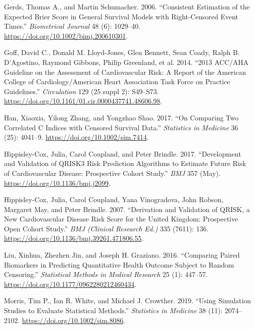 \documentclass[
]{article}
\newlength{\cslhangindent}
\newenvironment{cslreferences}%
  {\setlength{\parindent}{0pt}%
  \everypar{\setlength{\hangindent}{\cslhangindent}}\ignorespaces}%
  {\par}
\begin{document}
\begin{cslreferences}
\leavevmode\hypertarget{ref-gerds_consistent_2006}{}%
Gerds, Thomas A., and Martin Schumacher. 2006. ``Consistent Estimation of the Expected Brier Score in General Survival Models with Right-Censored Event Times.'' \emph{Biometrical Journal} 48 (6): 1029--40. \url{https://doi.org/10.1002/bimj.200610301}.

\leavevmode\hypertarget{ref-goff_2013_2014}{}%
Goff, David C., Donald M. Lloyd-Jones, Glen Bennett, Sean Coady, Ralph B. D'Agostino, Raymond Gibbons, Philip Greenland, et al. 2014. ``2013 ACC/AHA Guideline on the Assessment of Cardiovascular Risk: A Report of the American College of Cardiology/American Heart Association Task Force on Practice Guidelines.'' \emph{Circulation} 129 (25 suppl 2): S49--S73. \url{https://doi.org/10.1161/01.cir.0000437741.48606.98}.

\leavevmode\hypertarget{ref-han_comparing_2017}{}%
Han, Xiaoxia, Yilong Zhang, and Yongzhao Shao. 2017. ``On Comparing Two Correlated C Indices with Censored Survival Data.'' \emph{Statistics in Medicine} 36 (25): 4041--9. \url{https://doi.org/10.1002/sim.7414}.

\leavevmode\hypertarget{ref-hippisley-cox_development_2017}{}%
Hippisley-Cox, Julia, Carol Coupland, and Peter Brindle. 2017. ``Development and Validation of QRISK3 Risk Prediction Algorithms to Estimate Future Risk of Cardiovascular Disease: Prospective Cohort Study.'' \emph{BMJ} 357 (May). \url{https://doi.org/10.1136/bmj.j2099}.

\leavevmode\hypertarget{ref-hippisley-cox_derivation_2007}{}%
Hippisley-Cox, Julia, Carol Coupland, Yana Vinogradova, John Robson, Margaret May, and Peter Brindle. 2007. ``Derivation and Validation of QRISK, a New Cardiovascular Disease Risk Score for the United Kingdom: Prospective Open Cohort Study.'' \emph{BMJ (Clinical Research Ed.)} 335 (7611): 136. \url{https://doi.org/10.1136/bmj.39261.471806.55}.

\leavevmode\hypertarget{ref-liu_comparing_2016}{}%
Liu, Xinhua, Zhezhen Jin, and Joseph H. Graziano. 2016. ``Comparing Paired Biomarkers in Predicting Quantitative Health Outcome Subject to Random Censoring.'' \emph{Statistical Methods in Medical Research} 25 (1): 447--57. \url{https://doi.org/10.1177/0962280212460434}.

\leavevmode\hypertarget{ref-morris_using_2019}{}%
Morris, Tim P., Ian R. White, and Michael J. Crowther. 2019. ``Using Simulation Studies to Evaluate Statistical Methods.'' \emph{Statistics in Medicine} 38 (11): 2074--2102. \url{https://doi.org/10.1002/sim.8086}.


\end{cslreferences}
\end{document}
